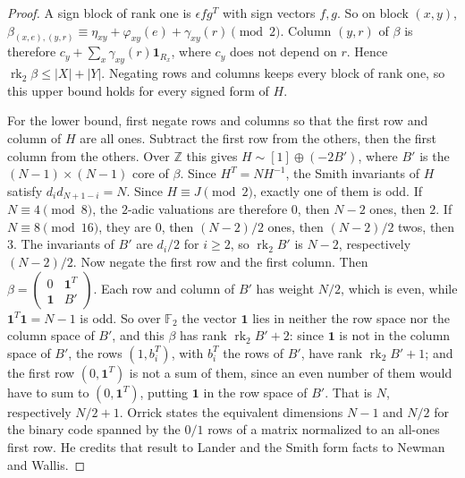 \documentclass[11pt,reqno]{amsart}
\theoremstyle{remark}\newtheorem{remark}[theorem]{Remark}
\begin{document}
\begin{proof}
A sign block of rank one is \(\epsilon fg^T\) with sign vectors \(f,g\). So on block \((x,y)\), \(\beta_{(x,e),(y,r)}\equiv\eta_{xy}+\varphi_{xy}(e)+\gamma_{xy}(r)\pmod 2\). Column \((y,r)\) of \(\beta\) is therefore \(c_y+\sum_x\gamma_{xy}(r)\mathbf 1_{R_x}\), where \(c_y\) does not depend on \(r\). Hence \(\operatorname{rk}_2\beta\le|X|+|Y|\). Negating rows and columns keeps every block of rank one, so this upper bound holds for every signed form of \(H\).

For the lower bound, first negate rows and columns so that the first row and column of \(H\) are all ones. Subtract the first row from the others, then the first column from the others. Over \(\mathbb Z\) this gives \(H\sim[1]\oplus(-2B')\), where \(B'\) is the \((N-1)\times(N-1)\) core of \(\beta\). Since \(H^T=NH^{-1}\), the Smith invariants of \(H\) satisfy \(d_id_{N+1-i}=N\). Since \(H\equiv J\pmod 2\), exactly one of them is odd. If \(N\equiv4\pmod 8\), the \(2\)-adic valuations are therefore \(0\), then \(N-2\) ones, then \(2\). If \(N\equiv8\pmod{16}\), they are \(0\), then \((N-2)/2\) ones, then \((N-2)/2\) twos, then \(3\). The invariants of \(B'\) are \(d_i/2\) for \(i\ge2\), so \(\operatorname{rk}_2B'\) is \(N-2\), respectively \((N-2)/2\). Now negate the first row and the first column. Then \(\beta=\left(\begin{smallmatrix}0&\mathbf 1^T\\ \mathbf 1&B'\end{smallmatrix}\right)\). Each row and column of \(B'\) has weight \(N/2\), which is even, while \(\mathbf 1^T\mathbf 1=N-1\) is odd. So over \(\mathbb F_2\) the vector \(\mathbf 1\) lies in neither the row space nor the column space of \(B'\), and this \(\beta\) has rank \(\operatorname{rk}_2B'+2\): since \(\mathbf 1\) is not in the column space of \(B'\), the rows \((1,b_i^T)\), with \(b_i^T\) the rows of \(B'\), have rank \(\operatorname{rk}_2B'+1\); and the first row \((0,\mathbf 1^T)\) is not a sum of them, since an even number of them would have to sum to \((0,\mathbf 1^T)\), putting \(\mathbf 1\) in the row space of \(B'\). That is \(N\), respectively \(N/2+1\). Orrick \cite[Theorem~4.3]{orrick} states the equivalent dimensions \(N-1\) and \(N/2\) for the binary code spanned by the \(0/1\) rows of a matrix normalized to an all-ones first row. He credits that result to Lander and the Smith form facts to Newman and Wallis.
\end{proof}
\end{document}
